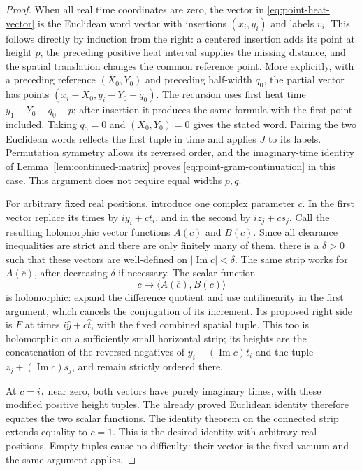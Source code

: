 \begin{proof}
When all real time coordinates are zero, the vector in
\eqref{eq:point-heat-vector} is the Euclidean word vector with insertions
$(x_i,y_i)$ and labels $v_i$. This follows directly by induction from the
right: a centered insertion adds its point at height $p$, the preceding
positive heat interval supplies the missing distance, and the spatial
translation changes the common reference point. More explicitly, with a
preceding reference $(X_0,Y_0)$ and preceding half-width $q_0$, the partial
vector has points
$(x_i-X_0,y_i-Y_0-q_0)$. The recursion uses first heat time
$y_1-Y_0-q_0-p$; after insertion it produces the same formula with the
first point included. Taking $q_0=0$ and $(X_0,Y_0)=0$ gives the stated
word. Pairing the two Euclidean words reflects the first tuple in time and
applies $J$ to its labels. Permutation symmetry allows its reversed order,
and the imaginary-time identity of Lemma~\ref{lem:continued-matrix} proves
\eqref{eq:point-gram-continuation} in this case. This argument does not
require equal widths $p,q$.

For arbitrary fixed real positions, introduce one complex parameter $c$.
In the first vector replace its times by $iy_i+c t_i$, and in the second
by $iz_j+c s_j$. Call the resulting holomorphic vector functions $A(c)$
and $B(c)$. Since all clearance inequalities are strict and there are only
finitely many of them, there is a $\delta>0$ such that these vectors are
well-defined on $|\operatorname{Im}c|<\delta$. The same strip works for
$A(\overline c)$, after decreasing $\delta$ if necessary. The scalar
function
\[
 c\longmapsto\langle A(\overline c),B(c)\rangle
\]
is holomorphic: expand the difference quotient and use antilinearity in
the first argument, which cancels the conjugation of its increment.
Its proposed right side is $F$ at times
$i\widehat y+c\widehat t$, with the fixed combined spatial tuple.
This too is holomorphic on a sufficiently small horizontal strip; its
heights are the concatenation of the reversed negatives of
$y_i-(\operatorname{Im}c)t_i$ and the tuple
$z_j+(\operatorname{Im}c)s_j$, and remain strictly ordered there.

At $c=i\tau$ near zero, both vectors have purely imaginary times, with
these modified positive height tuples. The already proved Euclidean
identity therefore equates the two scalar functions. The identity theorem
on the connected strip extends equality to $c=1$. This is the desired
identity with arbitrary real positions. Empty tuples cause no difficulty:
their vector is the fixed vacuum and the same argument applies.
\end{proof}


